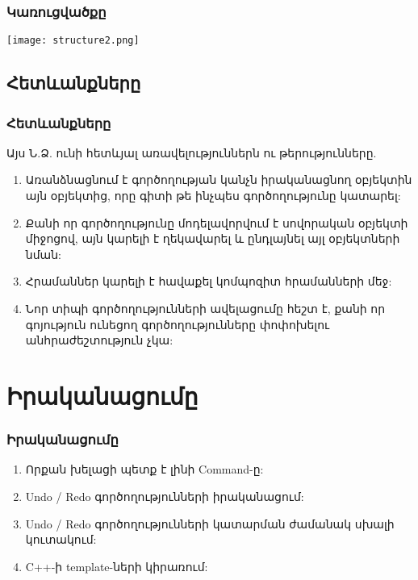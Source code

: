\documentclass{beamer}
\begin{document}
\begin{frame}\frametitle{Կառուցվածքը}
\begin{center}
    \texttt{[image: structure2.png]}
\end{center}
\end{frame}

\subsection{Հետևանքները}
\begin{frame}\frametitle{Հետևանքները}
Այս Ն.Ձ. ունի հետևյալ առավելություններն ու թերությունները.
\vfill
\begin{enumerate}
    \scriptsize
    \item Առանձնացնում է գործողության կանչն իրականացնող օբյեկտին այն օբյեկտից,
    որը գիտի թե ինչպես գործողությունը կատարել: \pause \vfill
    \item Քանի որ գործողությունը մոդելավորվում է սովորական օբյեկտի միջոցով,
    այն կարելի է ղեկավարել և ընդլայնել այլ օբյեկտների նման: \pause \vfill
    \item Հրամաններ կարելի է հավաքել կոմպոզիտ հրամանների մեջ: \pause \vfill
    \item Նոր տիպի գործողությունների ավելացումը հեշտ է, քանի որ գոյություն ունեցող
    գործողությունները փոփոխելու անհրաժեշտություն չկա:
\end{enumerate}
\end{frame}

\section{Իրականացումը}
\begin{frame}\frametitle{Իրականացումը}
\begin{enumerate}
    \item Որքան խելացի պետք է լինի Command-ը: \vfill
    \item Undo / Redo գործողությունների իրականացում: \vfill
    \item Undo / Redo գործողությունների կատարման ժամանակ սխալի կուտակում: \vfill
    \item C++-ի template-ների կիրառում:
\end{enumerate}
\end{frame}
\end{document}
